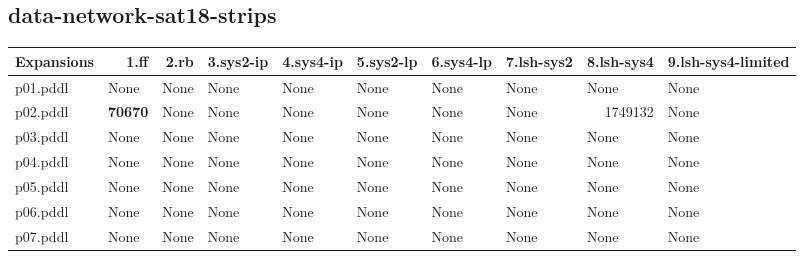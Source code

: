 \documentclass{article}
\begin{document}
\hypertarget{expansions-data-network-sat18-strips}{}
\subsection*{data-network-sat18-strips}

\begin{tabular}{@{}lrrrrrrrrr@{}}
Expansions & 1.ff & 2.rb & 3.sys2-ip & 4.sys4-ip & 5.sys2-lp & 6.sys4-lp & 7.lsh-sys2 & 8.lsh-sys4 & 9.lsh-sys4-limited \\
\midrule
p01.pddl & \multicolumn{1}{|l|}{None} & \multicolumn{1}{|l|}{None} & \multicolumn{1}{|l|}{None} & \multicolumn{1}{|l|}{None} & \multicolumn{1}{|l|}{None} & \multicolumn{1}{|l|}{None} & \multicolumn{1}{|l|}{None} & \multicolumn{1}{|l|}{None} & \multicolumn{1}{|l|}{None} \\
p02.pddl & \textbf{70670} & \multicolumn{1}{|l|}{None} & \multicolumn{1}{|l|}{None} & \multicolumn{1}{|l|}{None} & \multicolumn{1}{|l|}{None} & \multicolumn{1}{|l|}{None} & \multicolumn{1}{|l|}{None} & 1749132 & \multicolumn{1}{|l|}{None} \\
p03.pddl & \multicolumn{1}{|l|}{None} & \multicolumn{1}{|l|}{None} & \multicolumn{1}{|l|}{None} & \multicolumn{1}{|l|}{None} & \multicolumn{1}{|l|}{None} & \multicolumn{1}{|l|}{None} & \multicolumn{1}{|l|}{None} & \multicolumn{1}{|l|}{None} & \multicolumn{1}{|l|}{None} \\
p04.pddl & \multicolumn{1}{|l|}{None} & \multicolumn{1}{|l|}{None} & \multicolumn{1}{|l|}{None} & \multicolumn{1}{|l|}{None} & \multicolumn{1}{|l|}{None} & \multicolumn{1}{|l|}{None} & \multicolumn{1}{|l|}{None} & \multicolumn{1}{|l|}{None} & \multicolumn{1}{|l|}{None} \\
p05.pddl & \multicolumn{1}{|l|}{None} & \multicolumn{1}{|l|}{None} & \multicolumn{1}{|l|}{None} & \multicolumn{1}{|l|}{None} & \multicolumn{1}{|l|}{None} & \multicolumn{1}{|l|}{None} & \multicolumn{1}{|l|}{None} & \multicolumn{1}{|l|}{None} & \multicolumn{1}{|l|}{None} \\
p06.pddl & \multicolumn{1}{|l|}{None} & \multicolumn{1}{|l|}{None} & \multicolumn{1}{|l|}{None} & \multicolumn{1}{|l|}{None} & \multicolumn{1}{|l|}{None} & \multicolumn{1}{|l|}{None} & \multicolumn{1}{|l|}{None} & \multicolumn{1}{|l|}{None} & \multicolumn{1}{|l|}{None} \\
p07.pddl & \multicolumn{1}{|l|}{None} & \multicolumn{1}{|l|}{None} & \multicolumn{1}{|l|}{None} & \multicolumn{1}{|l|}{None} & \multicolumn{1}{|l|}{None} & \multicolumn{1}{|l|}{None} & \multicolumn{1}{|l|}{None} & \multicolumn{1}{|l|}{None} & \multicolumn{1}{|l|}{None} \\

\end{tabular}
\end{document}
